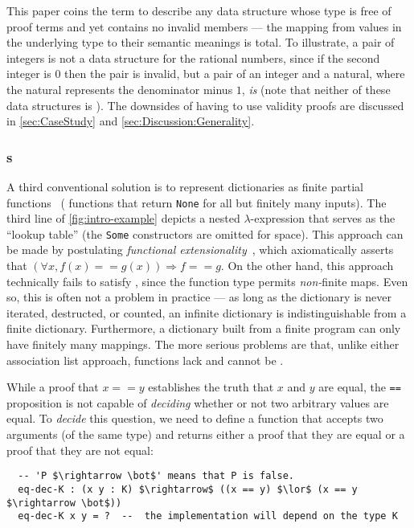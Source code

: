 This paper coins the term \firstUseGoal{\semanticallyTotal} to describe any data structure whose type is free of proof terms and yet contains no invalid members ---
%
\ie{} the mapping from values in the underlying type to their semantic meanings is total.
%
To illustrate, a pair of integers is not a \semanticallyTotal{} data structure for the rational numbers, since if the second integer is $0$ then the pair is invalid,
%
but a pair of an integer and a natural, where the natural represents the denominator minus $1$, \emph{is} \semanticallyTotal{} (note that neither of these data structures is \extensional).
%
The downsides of having to use validity proofs are discussed in \autoref{sec:CaseStudy} and \autoref{sec:Discussion:Generality}.

\subsubsection{\Fpf{}s}

A third conventional solution is to represent dictionaries as finite partial functions~\cite[Maps]{Pierce:SF1} (\ie{} functions that return \texttt{None} for all but finitely many inputs).
%
The third line of \autoref{fig:intro-example} depicts a nested $\lambda$-expression that serves as the ``lookup table'' (the \texttt{Some} constructors are omitted for space).
%
This approach can be made \extensional{} by postulating \emph{functional extensionality}~\mbox{\cite[Logic]{Pierce:SF1}}, which axiomatically asserts that $(\forall x, f(x) == g(x)) \Rightarrow f == g$.
%
On the other hand, this approach technically fails to satisfy \SemTot, since the function type permits \emph{non-}finite maps.
%
Even so, this is often not a problem in practice --- as long as the dictionary is never iterated, destructed, or counted, an infinite dictionary is indistinguishable from a finite dictionary.
%
Furthermore, a dictionary built from a finite program can only have finitely many mappings.
%
The more serious problems are that, unlike either association list approach, functions lack \firstUseGoal{\DecidableEq} and cannot be \firstUseGoal{\destructed}.


While a proof that $x == y$ establishes the truth that $x$ and $y$ are equal, the \texttt{==} proposition is not capable of \emph{deciding} whether or not two arbitrary values are equal.
%
To \emph{decide} this question, we need to define a function that accepts two arguments (of the same type) and returns either a proof that they are equal or a proof that they are not equal:
\begin{lstlisting}
  -- 'P $\rightarrow \bot$' means that P is false.
  eq-dec-K : (x y : K) $\rightarrow$ ((x == y) $\lor$ (x == y $\rightarrow \bot$))
  eq-dec-K x y = ?  --  the implementation will depend on the type K
\end{lstlisting}

